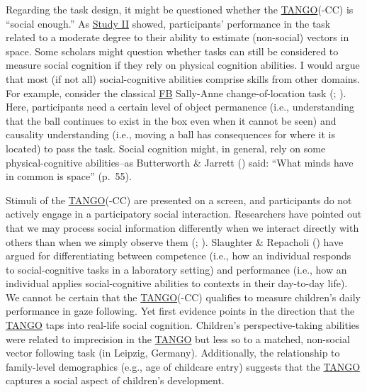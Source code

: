 \documentclass[
]{scrbook}
\begin{document}
Regarding the task design, it might be questioned whether the \hyperref[acronyms_TANGO]{TANGO}(-CC) is ``social enough.'' As \hyperref[studyII]{Study II} showed, participants' performance in the task related to a moderate degree to their ability to estimate (non-social) vectors in space. Some scholars might question whether tasks can still be considered to measure social cognition if they rely on physical cognition abilities. I would argue that most (if not all) social-cognitive abilities comprise skills from other domains. For example, consider the classical \hyperref[acronyms_FB]{FB} Sally-Anne change-of-location task (; ). Here, participants need a certain level of object permanence (i.e., understanding that the ball continues to exist in the box even when it cannot be seen) and causality understanding (i.e., moving a ball has consequences for where it is located) to pass the task. Social cognition might, in general, rely on some physical-cognitive abilities\thinspace --\thinspace as Butterworth \& Jarrett () said: ``What minds have in common is space'' (p.~55).

Stimuli of the \hyperref[acronyms_TANGO]{TANGO}(-CC) are presented on a screen, and participants do not actively engage in a participatory social interaction. Researchers have pointed out that we may process social information differently when we interact directly with others than when we simply observe them (; ). Slaughter \& Repacholi () have argued for differentiating between competence (i.e., how an individual responds to social-cognitive tasks in a laboratory setting) and performance (i.e., how an individual applies social-cognitive abilities to contexts in their day-to-day life). We cannot be certain that the \hyperref[acronyms_TANGO]{TANGO}(-CC) qualifies to measure children's daily performance in gaze following. Yet first evidence points in the direction that the \hyperref[acronyms_TANGO]{TANGO} taps into real-life social cognition. Children's perspective-taking abilities were related to imprecision in the \hyperref[acronyms_TANGO]{TANGO} but less so to a matched, non-social vector following task (in Leipzig, Germany). Additionally, the relationship to family-level demographics (e.g., age of childcare entry) suggests that the \hyperref[acronyms_TANGO]{TANGO} captures a social aspect of children's development.
\end{document}
